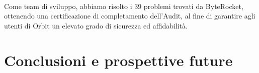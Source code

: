\documentclass[12pt,a4paper]{report}
\begin{document}
\noindent \\Come team di sviluppo, abbiamo risolto i 39 problemi trovati da ByteRocket, ottenendo una certificazione di completamento dell'Audit, al fine di garantire agli utenti di Orbit un elevato grado di sicurezza ed affidabilità.


\chapter{Conclusioni e prospettive future}

\nocite{mastering_ethereum}
\nocite{solidity_book}
\nocite{blockchain_book}
\nocite{js_book}
\nocite{ts_book}
\nocite{react_book}


\end{document}
